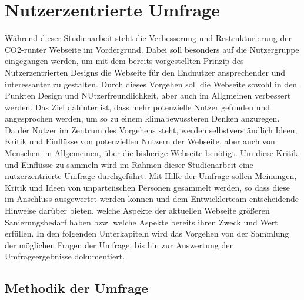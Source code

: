
\chapter{Nutzerzentrierte Umfrage}
\label{chapter:5}

Während dieser Studienarbeit steht die Verbesserung und Restrukturierung der CO2-runter Webseite im Vordergrund. Dabei soll besonders auf die Nutzergruppe eingegangen werden, um mit dem bereits vorgestellten Prinzip des Nutzerzentrierten Designs die Webseite für den Endnutzer ansprechender und interessanter zu gestalten.
Durch dieses Vorgehen soll die Webseite sowohl in den Punkten Design und NUtzerfreundlichkeit, aber auch im Allgmeinen verbessert werden. Das Ziel dahinter ist, dass mehr potenzielle Nutzer gefunden und angesprochen werden, um so zu einem klimabewussteren Denken anzuregen. \\

Da der Nutzer im Zentrum des Vorgehens steht, werden selbstverständlich Ideen, Kritik und Einflüsse von potenziellen Nutzern der Webseite, aber auch von Menschen im Allgemeinen, über die bisherige Webseite benötigt. Um diese Kritik und Einflüsse zu sammeln wird im Rahmen dieser Studienarbeit eine nutzerzentrierte Umfrage durchgeführt.
Mit Hilfe der Umfrage sollen Meinungen, Kritik und Ideen von unparteiischen Personen gesammelt werden, so dass diese im Anschluss ausgewertet werden können und dem Entwicklerteam entscheidende Hinweise darüber bieten, welche Aspekte der aktuellen Webseite größeren Sanierungsbedarf haben bzw. welche Aspekte bereits ihren Zweck und Wert erfüllen.
In den folgenden Unterkapiteln wird das Vorgehen von der Sammlung der möglichen Fragen der Umfrage, bis hin zur Auswertung der Umfrageergebnisse dokumentiert.

\section{Methodik der Umfrage}

